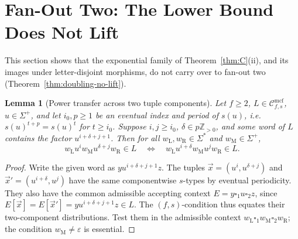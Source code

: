 \documentclass[11pt]{article}
\numberwithin{equation}{section}
\theoremstyle{plain}
\newtheorem{lemma}[theorem]{Lemma}
\theoremstyle{definition}
\theoremstyle{remark}
\newcommand{\Cmcf}[2]{\mathcal{C}^{\mathrm{mcf}}_{#1,#2}}
\newcommand{\tuple}[1]{\vec{#1}}
\newcommand{\blank}{\square}
\newcommand{\eps}{\varepsilon}
\theoremstyle{plain}
\begin{document}
\section{Fan-Out Two: The Lower Bound Does Not Lift}
\label{sec:fanout-two}
\label{subsec:power-transfer}

This section shows that the exponential family of Theorem~\ref{thm:C}(ii),
and its images under letter-disjoint morphisms, do not carry over to fan-out
two (Theorem~\ref{thm:doubling-no-lift}).

\begin{lemma}[Power transfer across two tuple components]
\label{lem:power-transfer}
Let $f\ge2$, $L\in\Cmcf{f}{s}$, $u\in\Sigma^+$, and let
$i_0,p\ge1$ be an eventual index and period of $s(u)$, i.e.\
$s(u)^{t+p}=s(u)^t$ for $t\ge i_0$. Suppose
$i,j\ge i_0$, $\delta\in p\mathbb Z_{>0}$, and some word of $L$
contains the factor $u^{i+\delta+j+1}$. Then for all
$w_{\mathrm L},w_{\mathrm R}\in\Sigma^*$ and $w_{\mathrm M}\in\Sigma^+$,
\[
 w_{\mathrm L}u^iw_{\mathrm M}u^{\delta+j}w_{\mathrm R}\in L\quad\Longleftrightarrow\quad
 w_{\mathrm L}u^{i+\delta}w_{\mathrm M}u^jw_{\mathrm R}\in L.
\]
\end{lemma}
\begin{proof}
Write the given word as $yu^{i+\delta+j+1}z$.
The tuples $\tuple x=(u^i,u^{\delta+j})$ and
$\tuple x'=(u^{i+\delta},u^j)$ have the same componentwise $s$-types
by eventual periodicity. They also have the common admissible
accepting context $E=y\blank_1u\blank_2z$, since
$E[\tuple x]=E[\tuple x']=yu^{i+\delta+j+1}z\in L$.
The $(f,s)$-condition thus equates their two-component distributions.
Test them in the admissible context $w_{\mathrm L}\blank_1w_{\mathrm M}\blank_2w_{\mathrm R}$;
the condition $w_{\mathrm M}\ne\eps$ is essential.
\end{proof}
\end{document}
